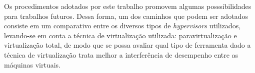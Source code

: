 \documentclass[[10pt,journal]{IEEEtran}
\begin{document}
Os procedimentos adotados por este trabalho promovem algumas posssibilidades para trabalhos futuros. Dessa forma, um dos caminhos que podem ser adotados consiste em um comparativo entre os diversos tipos de \textit{hypervisors} utilizados, levando-se em conta a técnica de virtualização utilizada: paravirtualização e virtualização total, de modo que se possa avaliar qual tipo de ferramenta dado a técnica de virtualização trata melhor a interferência de desempenho entre as máquinas virtuais.


%
%



%
%
\end{document}
